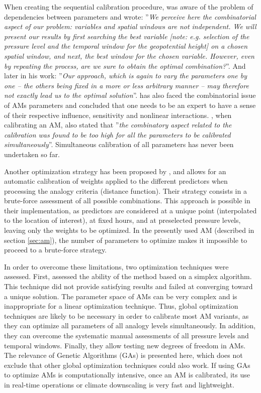 \documentclass{ametsoc}
\begin{document}
When creating the sequential calibration procedure, \citet{Bontron2004} was aware of the problem of dependencies between parameters and wrote: ''\textit{We perceive here the combinatorial aspect of our problem: variables and spatial windows are not independent. We will present our results by first searching the best variable [note: e.g. selection of the pressure level and the temporal window for the geopotential height] on a chosen spatial window, and next, the best window for the chosen variable. However, even by repeating the process, are we sure to obtain the optimal combination?}''. And later in his work: ''\textit{Our approach, which is again to vary the parameters one by one -- the others being fixed in a more or less arbitrary manner -- may therefore not exactly lead us to the optimal solution}''. \citet{Bliefernicht2010} has also faced the combinatorial issue of AMs parameters and concluded that one needs to be an expert to have a sense of their respective influence, sensitivity and nonlinear interactions. \citet{BenDaoud2010}, when calibrating an AM, also stated that ''\textit{the combinatory aspect related to the calibration was found to be too high for all the parameters to be calibrated simultaneously}''. Simultaneous calibration of all parameters has never been undertaken so far. 

Another optimization strategy has been proposed by \citet{Junk2015}, and allows for an automatic calibration of weights applied to the different predictors when processing the analogy criteria (distance function). Their strategy consists in a brute-force assessment of all possible combinations. This approach is possible in their implementation, as predictors are considered at a unique point (interpolated to the location of interest), at fixed hours, and at preselected pressure levels, leaving only the weights to be optimized. In the presently used AM (described in section \ref{sec:am}), the number of parameters to optimize makes it impossible to proceed to a brute-force strategy.

In order to overcome these limitations, two optimization techniques were assessed. First, \citet{Horton2012a} assessed the ability of the \citet{Nelder1965a} method based on a simplex algorithm. This technique did not provide satisfying results and failed at converging toward a unique solution. The parameter space of AMs can be very complex and is inappropriate for a linear optimization technique. Thus, global optimization techniques are likely to be necessary in order to calibrate most AM variants, as they can optimize all parameters of all analogy levels simultaneously. In addition, they can overcome the systematic manual assessments of all pressure levels and temporal windows. Finally, they allow testing new degrees of freedom in AMs. The relevance of Genetic Algorithms (GAs) is presented here, which does not exclude that other global optimization techniques could also work. If using GAs to optimize AMs is computationally intensive, once an AM is calibrated, its use in real-time operations or climate downscaling is very fast and lightweight.
\end{document}
